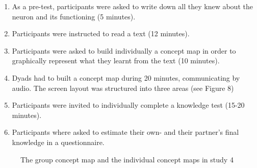 \documentclass[twocolumn]{article}
\begin{document}
\begin{enumerate}

    \item As a pre-test, participants were asked to write down all they knew
        about the neuron and its functioning (5 minutes).

    \item Participants were instructed to read a text (12 minutes). 

    \item Participants were asked to build individually a concept map in order to
        graphically represent what they learnt from the text (10 minutes). 

    \item Dyads had to built a concept map during 20 minutes, communicating by
        audio.  The screen layout was structured into three areas (see Figure 8) 

    \item Participants were invited to individually complete a knowledge test
        (15-20 minutes). 

    \item Participants where asked to estimate their own- and their partner's
        final knowledge in a questionnaire. 

\end{enumerate}



\begin{figure}
    \centering
    \caption{The group concept map and the individual concept maps in study
    4}
    \label{study4:concept_map}
\end{figure}
\end{document}
